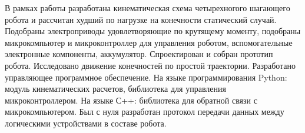 
В рамках работы разработана кинематическая схема четырехногого шагающего робота и рассчитан худший по нагрузке на конечности статический случай. Подобраны электроприводы удовлетворяющие по крутящему моменту, подобраны микрокомпьютер и микроконтроллер для управления роботом, вспомогательные электронные компоненты, аккумулятор. Спроектирован и собран прототип робота. Исследовано движение конечностей по простой траектории. Разработано управляющее программное обеспечение. На языке программирования Python: модуль кинематических расчетов, библиотека для управления микроконтроллером. На языке С++: библиотека для обратной связи с микрокомпьютером. Был с нуля разработан протокол передачи данных между логическими устройствами в составе робота.